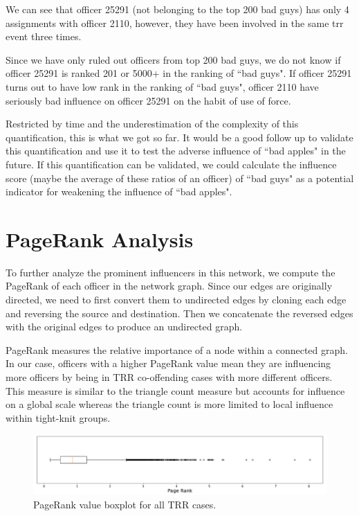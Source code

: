 \documentclass[10pt]{article}
\begin{document}
We can see that officer 25291 (not belonging to the top 200 bad guys) has only 4 assignments with officer 2110, however, they have been involved in the same trr event three times.

Since we have only ruled out officers from top 200 bad guys, we do not know if officer 25291 is ranked 201 or 5000+ in the ranking of ``bad guys". If officer 25291 turns out to have low rank in the ranking of ``bad guys", officer 2110 have seriously bad influence on officer 25291 on the habit of use of force.

Restricted by time and the underestimation of the complexity of this quantification, this is what we got so far. It would be a good follow up to validate this quantification and use it to test the adverse influence of ``bad apples" in the future. If this quantification can be validated, we could calculate the influence score (maybe the average of these ratios of an officer) of ``bad guys" as a potential indicator for weakening the influence of ``bad apples".




\section{PageRank Analysis}

To further analyze the prominent influencers in this network, we compute the PageRank of each officer in the network graph. Since our edges are originally directed, we need to first convert them to undirected edges by cloning each edge and reversing the source and destination. Then we concatenate the reversed edges with the original edges to produce an undirected graph.

PageRank measures the relative importance of a node within a connected graph. In our case, officers with a higher PageRank value mean they are influencing more officers by being in TRR co-offending cases with more different officers. This measure is similar to the triangle count measure but accounts for influence on a global scale whereas the triangle count is more limited to local influence within tight-knit groups.

\begin{figure}[H]
\centering
\includegraphics[width=\textwidth]{pr}
\caption{PageRank value boxplot for all TRR cases.}
\label{pr}
\end{figure}
\end{document}
